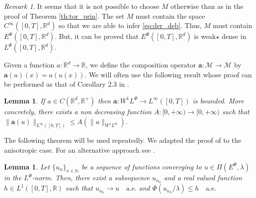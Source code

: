 \documentclass[twoside]{article}
\newtheorem{lem}[thm]{Lemma}
\theoremstyle{remark}
\newtheorem{comentario}{Remark}
\newcommand{\lphi}{L^{\Phi}}
\newcommand{\ephi}{E^{\Phi}}
\newcommand{\wphi}{W^{1}\lphi}
\renewcommand{\b}[1]{\boldsymbol{#1}}
\newcommand{\rr}{\mathbb{R}}
\renewcommand{\leq}{\leqslant}
\begin{document}
\begin{comentario} It seems that it is not possible to choose $M$ otherwise than as in
the proof of Theorem  \ref{th:tor_prin}. The set $M$ must contain the space $C^{\infty} ([0,T],\rr^d)$ 
so that we are able to infer \eqref{eq:der_deb}. Thus, $M$ must contain $\ephi([0,T],\rr^d)$. But, it can be  proved that $\ephi([0,T],\rr^d)$  is weak$\star$ dense in $\lphi([0,T],\rr^d)$.
\end{comentario}



Given a function $a:\mathbb{R}^d\to \mathbb{R}$, we define the composition operator $\b{a}:\mathcal{M}\to \mathcal{M}$ by $\b{a}(u)(x)= a(u(x))$.
We will often use the following result whose proof can be performed as that of  Corollary 2.3 in \cite{ABGMS2015}.
\begin{lem}\label{lem:cota-a}
\label{a_bound} If $a\in C(\mathbb{R}^d,\mathbb{R}^+)$ then $\b{a}:\wphi\to L^{\infty}([0,T])$ is bounded.
More concretely,  there exists a non decreasing function $A:[0,+\infty)\to[0,+\infty)$ such that
 $\|\b{a}(u)\|_{L^{\infty}([0,T])}\leq A(\|u\|_{\wphi})$.
\end{lem}

The following theorem will be used repeatedly. We adapted the proof of 
\cite[Lemma 2.5]{ABGMS2015} to the anisotropic case.    For an alternative approach see \cite{chamra2017anisotropic}.  







\begin{lem}\label{segundo lema}
Let  $\{{u}_n\}_{n\in \mathbb{N}}$ be a sequence of  functions  converging to  ${u}\in \Pi(\ephi,\lambda)$  in the $\lphi$-norm. Then, there exist a subsequence
${u}_{n_k}$ and a real valued function $h\in L^1([0,T],\rr)$ such that ${u}_{n_k}\rightarrow {u} \quad\text{a.e.}$ and $\Phi({u}_{n_k}/\lambda)\leq h\quad\text{a.e.}$
\end{lem}
\end{document}
